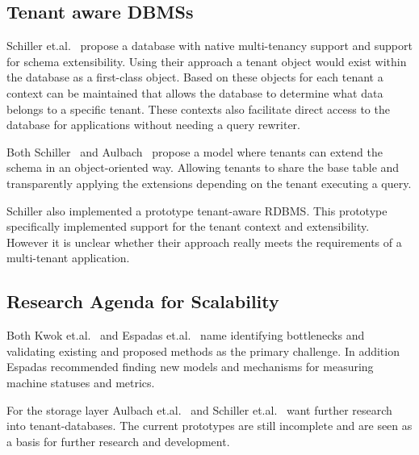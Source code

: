 \subsection{Tenant aware \acp{DBMS}}
Schiller et.al.~\cite{schiller2011native} propose a database with native multi-tenancy support and support for schema extensibility.
Using their approach a tenant object would exist within the database as a first-class object. 
Based on these objects for each tenant a context can be maintained that allows the database to determine what data belongs to a specific tenant. 
These contexts also facilitate direct access to the database for applications without needing a query rewriter.

Both Schiller~\cite{schiller2011native} and Aulbach~\cite{aulbach2011extensibility} propose a model where tenants can extend the schema in an object-oriented way.
Allowing tenants to share the base table and transparently applying the extensions depending on the tenant executing a query.

Schiller also implemented a prototype tenant-aware \ac{RDBMS}.
This prototype specifically implemented support for the tenant context and extensibility.
However it is unclear whether their approach really meets the requirements of a multi-tenant application.



\subsection{Research Agenda for Scalability}
Both Kwok et.al.~\cite{kwok2008resource} and Espadas et.al.~\cite{espadas2013tenant} name identifying bottlenecks and validating existing and proposed methods as the primary challenge.
In addition Espadas recommended finding new models and mechanisms for measuring machine statuses and metrics.

For the storage layer Aulbach et.al.~\cite{aulbach2009comparison, aulbach2008multi} and Schiller et.al.~\cite{schiller2011native} want further research into tenant-databases. The current prototypes are still incomplete and are seen as a basis for further research and development.


